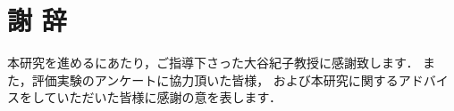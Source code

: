 \chapter*{謝 辞}
本研究を進めるにあたり，ご指導下さった大谷紀子教授に感謝致します．
また，評価実験のアンケートに協力頂いた皆様，
および本研究に関するアドバイスをしていただいた皆様に感謝の意を表します．
